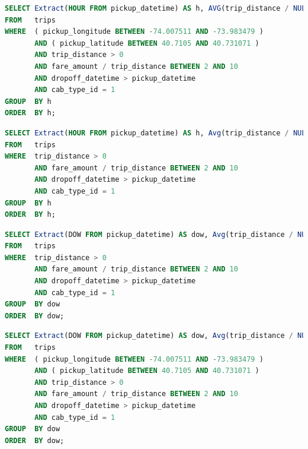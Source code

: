 \begin{lstlisting}[language=sql, caption={Query 6, Determines the average speed of the yellow taxi trips by hour of the day in a bounding box},captionpos=b]
SELECT Extract(HOUR FROM pickup_datetime) AS h, AVG(trip_distance / NULLIF(TIMESTAMPDIFF(HOUR,pickup_datetime, dropoff_datetime),0)) AS speed
FROM   trips
WHERE  ( pickup_longitude BETWEEN -74.007511 AND -73.983479 )
       AND ( pickup_latitude BETWEEN 40.7105 AND 40.731071 )
       AND trip_distance > 0
       AND fare_amount / trip_distance BETWEEN 2 AND 10
       AND dropoff_datetime > pickup_datetime
       AND cab_type_id = 1
GROUP  BY h
ORDER  BY h;
\end{lstlisting}


\begin{lstlisting}[language=sql, caption={Query 7, Computes the average speed of the yellow taxi trips by hour of the day},captionpos=b]
SELECT Extract(HOUR FROM pickup_datetime) AS h, Avg(trip_distance / NULLIF(TIMESTAMPDIFF(HOUR, pickup_datetime, dropoff_datetime),0))AS speed
FROM   trips
WHERE  trip_distance > 0
       AND fare_amount / trip_distance BETWEEN 2 AND 10
       AND dropoff_datetime > pickup_datetime
       AND cab_type_id = 1
GROUP  BY h
ORDER  BY h;
\end{lstlisting}


\begin{lstlisting}[language=sql, caption={Query 8, Calculates the average speed of the yellow taxi trips by day of the week},captionpos=b]
SELECT Extract(DOW FROM pickup_datetime) AS dow, Avg(trip_distance / NULLIF(TIMESTAMPDIFF(HOUR,pickup_datetime,  dropoff_datetime), 0)) AS speed
FROM   trips
WHERE  trip_distance > 0
       AND fare_amount / trip_distance BETWEEN 2 AND 10
       AND dropoff_datetime > pickup_datetime
       AND cab_type_id = 1
GROUP  BY dow
ORDER  BY dow;
\end{lstlisting}


\begin{lstlisting}[language=sql, caption={Query 9, Determines the average speed of the yellow taxi trips by day of the week in a bounding box},captionpos=b]
SELECT Extract(DOW FROM pickup_datetime) AS dow, Avg(trip_distance / NULLIF(TIMESTAMPDIFF(HOUR,pickup_datetime,  dropoff_datetime), 0)) AS speed
FROM   trips
WHERE  ( pickup_longitude BETWEEN -74.007511 AND -73.983479 )
       AND ( pickup_latitude BETWEEN 40.7105 AND 40.731071 )
       AND trip_distance > 0
       AND fare_amount / trip_distance BETWEEN 2 AND 10
       AND dropoff_datetime > pickup_datetime
       AND cab_type_id = 1
GROUP  BY dow
ORDER  BY dow;
\end{lstlisting}

